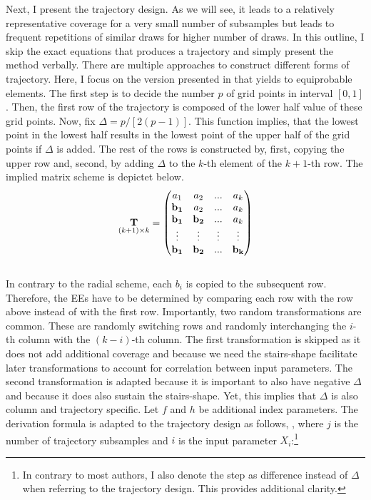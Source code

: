 \documentclass[a4paper,12pt]{article}
\begin{document}
\noindent
Next, I present the trajectory design. As we will see, it leads to a relatively representative coverage for a very small number of subsamples but leads to frequent repetitions of similar draws for higher number of draws.
In this outline, I skip the exact equations that produces a trajectory and simply present the method verbally.
There are multiple approaches to construct different forms of trajectory. Here, I focus on the version presented in \cite{Morris.1991} that yields to equiprobable elements. The first step is to decide the number $p$ of grid points in interval $[0,1]$. Then, the first row of the trajectory is composed of the lower half value of these grid points. Now, fix $\Delta = p/[2(p-1)]$. This function implies, that the lowest point in the lowest half results in the lowest point of the upper half of the grid points if $\Delta$ is added. The rest of the rows is constructed by, first, copying the upper row and, second, by adding $\Delta$ to the $k$-th element of the $k+1$-th row. The implied matrix scheme is depictet below.
\begin{align}
\underset{(k+1)\times k}{\bold{T}} =
\begin{pmatrix}
a_1 & a_2 & ... & a_k \\
\bold{b_1} & a_2 & ... & a_k \\
\bold{b_1} & \bold{b_2} & ... & a_k \\
\vdots & \vdots & \vdots & \vdots\\
\bold{b_1} & \bold{b_2} & ... & \bold{b_k}
\end{pmatrix}
\end{align}
\\

\noindent
In contrary to the radial scheme, each $b_i$ is copied to the subsequent row. Therefore, the EEs have to be determined by comparing each row with the row above instead of with the first row.
Importantly, two random transformations are common. These are randomly switching rows and randomly interchanging the $i$-th column with the $(k-i)$-th column. The first transformation is skipped as it does not add additional coverage and because we need the stairs-shape facilitate later transformations to account for correlation between input parameters. The second transformation is adapted because it is important to also have negative $\Delta$ and because it does also sustain the stairs-shape. Yet, this implies that $\Delta$ is also column and trajectory specific. Let $f$ and $h$ be additional index parameters. The derivation formula is adapted to the trajectory design as follows, , where $j$ is the number of trajectory subsamples and $i$ is the input parameter $X_i$:\footnote{In contrary to most authors, I also denote the step as difference instead of $\Delta$ when referring to the trajectory design. This provides additional clarity.}
\end{document}
